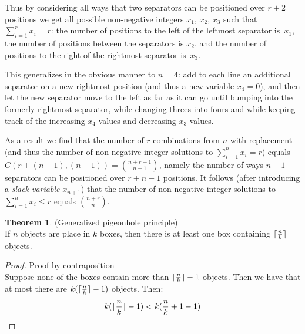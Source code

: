 \documentclass[titlepage]{article}
\DeclarePairedDelimiter{\ceil}{\lceil}{\rceil}
\theoremstyle{definition}
\newtheorem{theorem}{Theorem}[section]
\numberwithin{equation}{subsection}
\numberwithin{remark}{subsection}
\begin{document}
\par\noindent
Thus by considering all ways that two separators can be positioned over $r+2$ positions we get all possible non-negative integers $x_1$, $x_2$, $x_3$ such that $\sum_{i=1}^rx_i=r$: the number of positions to the left of the leftmost separator is~$x_1$, the number of positions between the separators is $x_2$, and the number of positions to the right of the rightmost separator is~$x_3$.

This generalizes in the obvious manner to $n=4$: add to each line an additional separator on a new rightmost position (and thus a new variable $x_4=0$), and then let the new separator move to the left as far as it can go until bumping into the formerly rightmost separator, while changing threes into fours and while keeping track of the increasing $x_4$-values and decreasing $x_3$-values.

As a result we find that the number of $r$-combinations from $n$ with replacement (and thus the number of non-negative integer solutions to $\sum_{i=1}^nx_i= r$) equals $C(r+(n-1),(n-1))={n+r-1\choose n-1}$, namely the number of ways $n-1$ separators can be positioned over $r+n-1$ positions. It follows (after introducing a \emph{slack variable} $x_{n+1}$) that the number of non-negative integer solutions to $\sum_{i=1}^nx_i\le r$ \textcolor{gray}{equals} $n+r\choose n$.\\
\par\noindent

\begin{theorem}(Generalized pigeonhole principle)
\\ 

If $n$ objects are place in $k$ boxes, then there is at least one box containing $\ceil{\frac{n}{k}}$ objects. 
\end{theorem}

\begin{proof} Proof by contraposition
\\

Suppose none of the boxes contain more than $\ceil{\frac{n}{k}} - 1$ objects. Then we have that at most there are $k(\ceil{\frac{n}{k}} - 1)$ objects. Then:
$$k(\ceil{\frac{n}{k}} - 1) < k(\frac{n}{k} + 1 - 1)$$
\end{proof}
\end{document}
